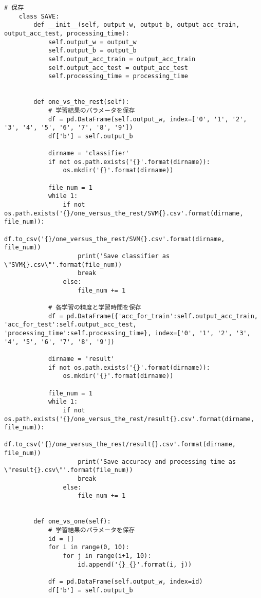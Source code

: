 \begin{lstlisting}[caption=課題2のMNISTの数字画像識別におけるSVM学習用プログラム]
    # 保存
    class SAVE:
        def __init__(self, output_w, output_b, output_acc_train, output_acc_test, processing_time):
            self.output_w = output_w
            self.output_b = output_b
            self.output_acc_train = output_acc_train
            self.output_acc_test = output_acc_test
            self.processing_time = processing_time

        
        def one_vs_the_rest(self):
            # 学習結果のパラメータを保存
            df = pd.DataFrame(self.output_w, index=['0', '1', '2', '3', '4', '5', '6', '7', '8', '9'])
            df['b'] = self.output_b

            dirname = 'classifier'
            if not os.path.exists('{}'.format(dirname)):
                os.mkdir('{}'.format(dirname))

            file_num = 1
            while 1:
                if not os.path.exists('{}/one_versus_the_rest/SVM{}.csv'.format(dirname, file_num)):
                    df.to_csv('{}/one_versus_the_rest/SVM{}.csv'.format(dirname, file_num))
                    print('Save classifier as \"SVM{}.csv\"'.format(file_num))
                    break
                else:
                    file_num += 1

            # 各学習の精度と学習時間を保存
            df = pd.DataFrame({'acc_for_train':self.output_acc_train, 'acc_for_test':self.output_acc_test, 'processing_time':self.processing_time}, index=['0', '1', '2', '3', '4', '5', '6', '7', '8', '9'])
            
            dirname = 'result'
            if not os.path.exists('{}'.format(dirname)):
                os.mkdir('{}'.format(dirname))

            file_num = 1
            while 1:
                if not os.path.exists('{}/one_versus_the_rest/result{}.csv'.format(dirname, file_num)):
                    df.to_csv('{}/one_versus_the_rest/result{}.csv'.format(dirname, file_num))
                    print('Save accuracy and processing time as \"result{}.csv\"'.format(file_num))
                    break
                else:
                    file_num += 1


        def one_vs_one(self):
            # 学習結果のパラメータを保存
            id = []
            for i in range(0, 10):
                for j in range(i+1, 10):
                    id.append('{}_{}'.format(i, j))

            df = pd.DataFrame(self.output_w, index=id)
            df['b'] = self.output_b


\end{lstlisting}
